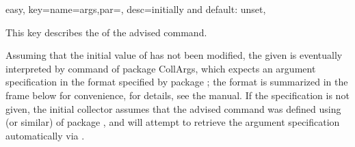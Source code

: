 \documentclass[a4paper,11pt]{article}
\begin{document}
\begin{doc}{easy,
    key={name=args,par=, desc=initially and default: unset},
  }

  This key describes the  of the advised command.

  Assuming that the initial value of  has not been
  modified, the given  is eventually interpreted
  by command  of package CollArgs, which expects an
  argument specification in the format specified by package ; the
  format is summarized in the frame below for convenience, for details, see the
   manual.  If the specification is not given, the initial collector
  assumes that the advised command was defined using 
  (or similar) of package , and will attempt to retrieve the argument
  specification automatically via .
  

\end{doc}
\end{document}
